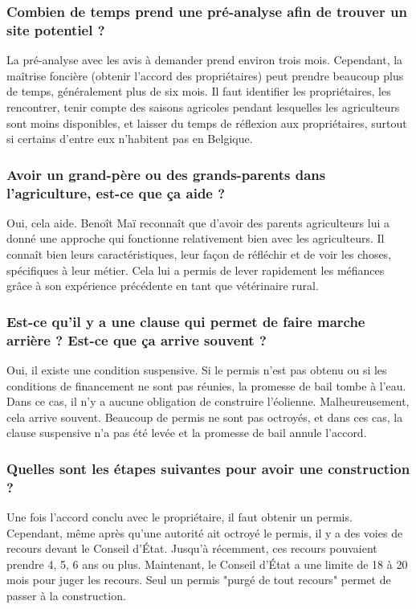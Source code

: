 \subsubsection{Combien de temps prend une pré-analyse afin de trouver un site potentiel ?}

La pré-analyse avec les avis à demander prend environ trois mois. Cependant, la maîtrise foncière (obtenir l'accord des propriétaires) peut prendre beaucoup plus de temps, généralement plus de six mois. Il faut identifier les propriétaires, les rencontrer, tenir compte des saisons agricoles pendant lesquelles les agriculteurs sont moins disponibles, et laisser du temps de réflexion aux propriétaires, surtout si certains d'entre eux n'habitent pas en Belgique.

\subsubsection{Avoir un grand-père ou des grands-parents dans l'agriculture, est-ce que ça aide ?}

Oui, cela aide. Benoît Maï reconnaît que d'avoir des parents agriculteurs lui a donné une approche qui fonctionne relativement bien avec les agriculteurs. Il connaît bien leurs caractéristiques, leur façon de réfléchir et de voir les choses, spécifiques à leur métier. Cela lui a permis de lever rapidement les méfiances grâce à son expérience précédente en tant que vétérinaire rural.

\subsubsection{Est-ce qu'il y a une clause qui permet de faire marche arrière ? Est-ce que ça arrive souvent ?}

Oui, il existe une condition suspensive. Si le permis n'est pas obtenu ou si les conditions de financement ne sont pas réunies, la promesse de bail tombe à l'eau. Dans ce cas, il n'y a aucune obligation de construire l'éolienne. Malheureusement, cela arrive souvent. Beaucoup de permis ne sont pas octroyés, et dans ces cas, la clause suspensive n'a pas été levée et la promesse de bail annule l'accord.

\subsubsection{Quelles sont les étapes suivantes pour avoir une construction ?}

Une fois l'accord conclu avec le propriétaire, il faut obtenir un permis. Cependant, même après qu'une autorité ait octroyé le permis, il y a des voies de recours devant le Conseil d'État. Jusqu'à récemment, ces recours pouvaient prendre 4, 5, 6 ans ou plus. Maintenant, le Conseil d'État a une limite de 18 à 20 mois pour juger les recours. Seul un permis "purgé de tout recours" permet de passer à la construction.

